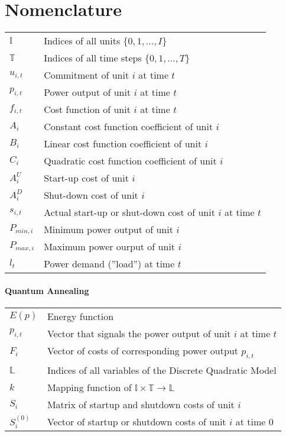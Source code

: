 \chapter*{Nomenclature}

\begin{tabular}{ll}
  $\mathbb{I}$ & Indices of all units $\{0, 1, \ldots, I\}$\\
  $\mathbb{T}$ & Indices of all time steps $\{0, 1, \ldots, T\}$ \\
  $u_{i, t}$ & Commitment of unit $i$ at time $t$ \\
  $p_{i, t}$ & Power output of unit $i$ at time $t$ \\
  $f_{i, t}$ & Cost function of unit $i$ at time $t$ \\
  $A_i$ & Constant cost function coefficient of unit $i$ \\
  $B_i$ & Linear cost function coefficient of unit $i$ \\
  $C_i$ & Quadratic cost function coefficient of unit $i$ \\
  $A^U_i$ & Start-up cost of unit $i$ \\
  $A^D_i$ & Shut-down cost of unit $i$ \\
  $s_{i, t}$ & Actual start-up or shut-down cost of unit $i$ at time $t$ \\
  $P_{min, i}$ & Minimum power output of unit $i$ \\
  $P_{max, i}$ & Maximum power ourput of unit $i$ \\
  $l_t$ & Power demand (''load'') at time $t$
\end{tabular}

\subsubsection{Quantum Annealing}

\begin{tabular}{ll}
  $E(p)$ & Energy function \\
  $p_{i, t}$ & Vector that signals the power output of unit $i$ at time $t$ \\
  $F_{i}$ & Vector of costs of corresponding power output $p_{i, t}$ \\
  $\mathbb{L}$ & Indices of all variables of the Discrete Quadratic Model \\
  $k$ & Mapping function of $\mathbb{I} \times \mathbb{T} \to \mathbb{L}$ \\
  $S_{i}$ & Matrix of startup and shutdown costs of unit $i$ \\
  $S_i^{(0)}$ & Vector of startup or shutdown costs of unit $i$ at time $0$
\end{tabular}
